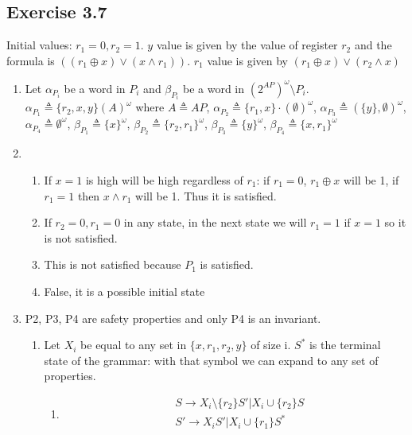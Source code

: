 \documentclass{article}
\begin{document}
	\subsection*{Exercise 3.7}
	Initial values: $r_1 = 0, r_2 = 1$.
	$y$ value is given by the value of register $r_2$ and the formula is $((r_1 \oplus x) \lor (x \land r_1))$.
	$r_1$ value is given by $(r_1 \oplus x) \lor (r_2 \land x)$
	
	\begin{enumerate}[label=\alph*)]
		\item Let $\alpha_{P_i}$ be a word in $P_i$ and $\beta_{P_i}$ be a word in $(2^{AP})^\omega \setminus P_i $.$\alpha_{P_1} \triangleq \{r_2, x, y\}(A)^\omega$ where $A \triangleq AP $,  $\alpha_{P_2} \triangleq \{r_1, x\} \cdot (\emptyset)^\omega$, $\alpha_{P_3} \triangleq (\{y\}, \emptyset)^{\omega}$, $\alpha_{P_4} \triangleq \emptyset^\omega$, $\beta_{P_1} \triangleq \{x\}^{\omega}$, $\beta_{P_2} \triangleq \{r_2, r_1\}^{\omega}$, $\beta_{P_3} \triangleq \{y\}^{\omega}$, $\beta_{P_4} \triangleq \{x, r_1\}^{\omega}$
		\item \begin{enumerate}[label=P\arabic*)]
			\item If $x=1$ is high will be high regardless of $r_1$: if $r_1=0$, $r_1 \oplus x$ will be 1, if $r_1=1$ then $x \land r_1$ will be 1. Thus it is satisfied.
			\item If $r_2 = 0, r_1 = 0$ in any state, in the next state we will $r_1=1$ if $x=1$ so it is not satisfied.
			\item This is not satisfied because $P_1$ is satisfied.
			\item False, it is a possible initial state
		\end{enumerate}
		\item P2, P3, P4 are safety properties and only P4 is an invariant.
		\begin{enumerate}[label=\roman*)]
			\item Let $X_i$ be equal to any set in $\{x, r_1, r_2, y\}$ of size i. $S^*$ is the terminal state of the grammar: with that symbol we can expand to any set of properties.
				\begin{enumerate}[label=P\arabic*), start = 2]
				\item \begin{align*}
					&S \rightarrow X_i \setminus \{r_2\} S' | X_i \cup \{r_2\} S\\
					&S' \rightarrow X_i S' | X_i \cup \{r_1\} S^* \\
				\end{align*}

\end{enumerate}
\end{enumerate}
\end{enumerate}
\end{document}
